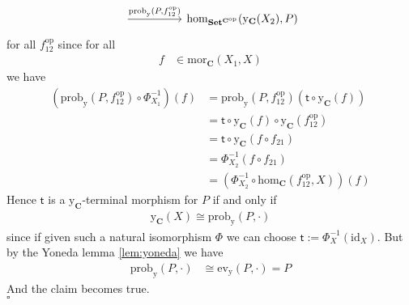 \begin{prf}
\[\begin{tikzcd}[sep=huge]
  \arrow{r}{\mathrm{prob}_{\mathrm{y}}(P,f_{12}^{\mathrm{op}})}
  &
  \mathrm{hom}_{\mathbf{Set}^{\mathbf{C}^{\mathrm{op}}}}
  (\mathrm{y}_{\mathbf{C}}(X_{2}),P)
\end{tikzcd}
\]
for all $f_{12}^{\mathrm{op}}$ since for all
\begin{align*}
  f
  &\in
  \mathrm{mor}_{\mathbf{C}}(X_{1},X)
\end{align*}
we have
\begin{align*}
  \left(
    \mathrm{prob}_{\mathrm{y}}(P,f_{12}^{\mathrm{op}})
    \circ
    \Phi_{X_{1}}^{-1}
  \right)
  (f)
  &=
  \mathrm{prob}_{\mathrm{y}}(P,f_{12}^{\mathrm{op}})
  \left(
    \mathsf{t}
    \circ
    \mathrm{y}_{\mathbf{C}}(f)
  \right)
  \\
  &=
  \mathsf{t}
  \circ
  \mathrm{y}_{\mathbf{C}}(f)
  \circ
  \mathrm{y}_{\mathbf{C}}(f_{12}^{\mathrm{op}})
  \\
  &=
  \mathsf{t}
  \circ
  \mathrm{y}_{\mathbf{C}}(f \circ f_{21})
  \\
  &=
  \Phi_{X_{2}}^{-1}(f \circ f_{21})
  \\
  &=
  \left(
    \Phi_{X_{2}}^{-1}
    \circ
    \mathrm{hom}_{\mathbf{C}}(f_{12}^{\mathrm{op}},X)
  \right)
  (f)
\end{align*}
Hence $\mathsf{t}$ is a $\mathrm{y}_{\mathbf{C}}$-terminal morphism for $P$ if and only if
\begin{align*}
  \mathrm{y}_{\mathbf{C}}(X)
  \cong
  \mathrm{prob}_{\mathrm{y}}(P,\cdot)
\end{align*}
since if given such a natural isomorphism $\Phi$ we can choose $\mathsf{t} := \Phi_{X}^{-1}(\mathrm{id}_{X})$. But by the Yoneda lemma \ref{lem:yoneda} we have
\begin{align*}
  \mathrm{prob}_{\mathrm{y}}(P,\cdot)
  &\cong
  \mathrm{ev}_{\mathrm{y}}(P,\cdot)
  =
  P
\end{align*}
And the claim becomes true.
\\
\phantom{proven}
\hfill
$\square$
\end{prf}

